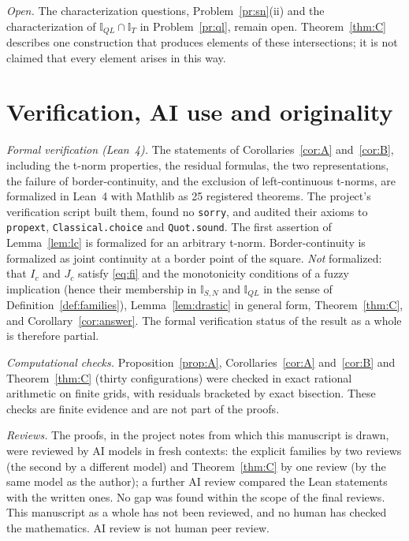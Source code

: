 \documentclass[11pt]{amsart}
\numberwithin{equation}{section}
\theoremstyle{definition}
\theoremstyle{remark}
\newcommand{\cI}{\mathbb{I}}
\begin{document}
\emph{Open.} The characterization questions, Problem~\ref{pr:sn}(ii) and the
characterization of $\cI_{QL}\cap\cI_T$ in Problem~\ref{pr:ql}, remain open.
Theorem~\ref{thm:C} describes one construction that produces elements of
these intersections; it is not claimed that every element arises in this way.

\section*{Verification, AI use and originality}

\emph{Formal verification (Lean~4).} The statements of
Corollaries~\ref{cor:A} and~\ref{cor:B}, including the t-norm properties, the
residual formulas, the two representations, the failure of
border-continuity, and the exclusion of left-continuous t-norms, are
formalized in Lean~4 with Mathlib as 25 registered theorems. The project's
verification script built them, found no \texttt{sorry}, and audited their
axioms to \texttt{propext}, \texttt{Classical.choice} and
\texttt{Quot.sound}. The first assertion of Lemma~\ref{lem:lc} is formalized for an
arbitrary t-norm. Border-continuity is formalized as joint continuity at a
border point of the square. \emph{Not} formalized: that $I_c$ and $J_c$
satisfy \eqref{eq:fi} and the monotonicity conditions of a fuzzy implication
(hence their membership in $\cI_{S,N}$ and $\cI_{QL}$ in the sense of
Definition~\ref{def:families}), Lemma~\ref{lem:drastic} in general form,
Theorem~\ref{thm:C}, and Corollary~\ref{cor:answer}. The
formal verification status of the result as a whole is therefore partial.

\emph{Computational checks.} Proposition~\ref{prop:A},
Corollaries~\ref{cor:A} and~\ref{cor:B} and Theorem~\ref{thm:C} (thirty
configurations) were checked in exact rational arithmetic on finite grids,
with residuals bracketed by exact bisection. These checks are finite evidence
and are not part of the proofs.

\emph{Reviews.} The proofs, in the project notes from which this manuscript
is drawn, were reviewed by AI models in fresh contexts: the
explicit families by two reviews (the second by a different model) and
Theorem~\ref{thm:C} by one review (by the same model as the author); a
further AI review compared the Lean statements with the written ones. No gap
was found within the scope of the final reviews. This manuscript as a whole
has not been reviewed, and no human has checked the mathematics. AI review is
not human peer review.
\end{document}
